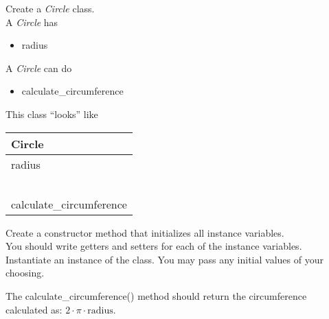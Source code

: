 \documentclass{article}
\newcommand{\tab}{\hspace*{0.25in}}
\begin{document}
\begin{enumerate}



	\begin{minipage}{.6\textwidth}
	\item Create a \textit{Circle} class.\\		
		A \textit{Circle} has
		\begin{itemize}
			\item radius 
		\end{itemize}

		A \textit{Circle} can do
		\begin{itemize}
			\item calculate\_circumference
		\end{itemize}
	\end{minipage}
	\begin{minipage}{.4\textwidth}
		This class ``looks'' like 
				
		\vspace*{1em}
		\begin{tabular}{|l|}
			\hline Circle\\ \hline
			radius\\ \ \\  \hline
			calculate\_circumference\\ \hline
		\end{tabular}
	\end{minipage}

	\vspace*{2ex}
	Create a constructor method that initializes all instance variables.\\
	You should write getters and setters for each of the instance variables.\\
	Instantiate an instance of the class. You may pass any initial values of your choosing.	

	The calculate\_circumference() method should return the circumference calculated as: $2 \cdot \pi \cdot \text{radius}$.\\



\end{enumerate}
\pagebreak
\end{document}
